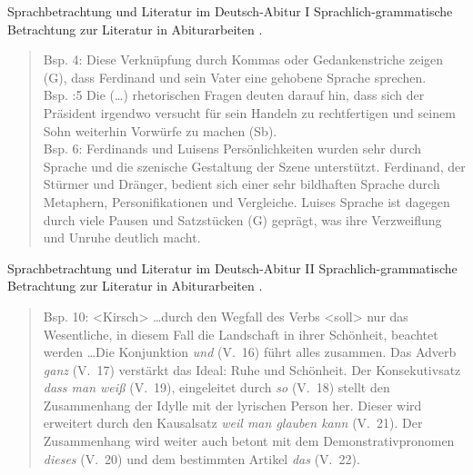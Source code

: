 \begin{frame}
  {Sprachbetrachtung und Literatur im Deutsch-Abitur I}
  \onslide<+->
  \onslide<+->
  Sprachlich-grammatische Betrachtung zur Literatur in Abiturarbeiten .\\
  \Zeile
  \onslide<+->
  \begin{quote}
    Bsp. 4: Diese Verknüpfung durch Kommas oder Gedankenstriche zeigen (G), dass Ferdinand und sein Vater eine gehobene Sprache sprechen.\\
    \Zeile
    \onslide<+->
    Bsp. :5 Die (\ldots) rhetorischen Fragen deuten darauf hin, dass sich der Präsident irgendwo versucht für sein Handeln zu rechtfertigen und seinem Sohn weiterhin Vorwürfe zu machen (Sb).\\
    \Zeile
    \onslide<+->
    Bsp. 6: Ferdinands und Luisens Persönlichkeiten wurden sehr durch Sprache und die szenische Gestaltung der Szene unterstützt. Ferdinand, der Stürmer und Dränger, bedient sich einer sehr bildhaften Sprache durch Metaphern, Personifikationen und Vergleiche. Luises Sprache ist dagegen durch viele Pausen und Satzstücken (G) geprägt, was ihre Verzweiflung und Unruhe deutlich macht.
  \end{quote}
\end{frame}

\begin{frame}
  {Sprachbetrachtung und Literatur im Deutsch-Abitur II}
  \onslide<+->
  \onslide<+->
  Sprachlich-grammatische Betrachtung zur Literatur in Abiturarbeiten .\\
  \Zeile
  \onslide<+->
  \begin{quote}
    Bsp. 10: <Kirsch> \ldots durch den Wegfall des Verbs <soll> nur das Wesentliche, in diesem Fall die Landschaft in ihrer Schönheit, beachtet werden \ldots Die Konjunktion \textit{und} (V.\ 16) führt alles zusammen. Das Adverb \textit{ganz} (V.\ 17) verstärkt das Ideal: Ruhe und Schönheit. Der Konsekutivsatz \textit{dass man weiß} (V.\ 19), eingeleitet durch \textit{so} (V.\ 18) stellt den Zusammenhang der Idylle mit der lyrischen Person her. Dieser wird erweitert durch den Kausalsatz \textit{weil man glauben kann} (V.\ 21). Der Zusammenhang wird weiter auch betont mit dem Demonstrativpronomen \textit{dieses} (V.\ 20) und dem bestimmten Artikel \textit{das} (V.\ 22). 
  \end{quote}
\end{frame}


